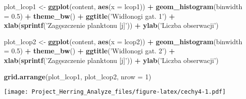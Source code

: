 \documentclass[]{article}
\newenvironment{Shaded}{\begin{snugshade}}{\end{snugshade}}
\newcommand{\DataTypeTok}[1]{\textcolor[rgb]{0.13,0.29,0.53}{#1}}
\newcommand{\DecValTok}[1]{\textcolor[rgb]{0.00,0.00,0.81}{#1}}
\newcommand{\FloatTok}[1]{\textcolor[rgb]{0.00,0.00,0.81}{#1}}
\newcommand{\KeywordTok}[1]{\textcolor[rgb]{0.13,0.29,0.53}{\textbf{#1}}}
\newcommand{\NormalTok}[1]{#1}
\newcommand{\OperatorTok}[1]{\textcolor[rgb]{0.81,0.36,0.00}{\textbf{#1}}}
\newcommand{\StringTok}[1]{\textcolor[rgb]{0.31,0.60,0.02}{#1}}
\begin{document}
\begin{Shaded}
\begin{Highlighting}[]
\NormalTok{plot_lcop1 <-}\StringTok{ }\KeywordTok{ggplot}\NormalTok{(content, }\KeywordTok{aes}\NormalTok{(}\DataTypeTok{x =}\NormalTok{ lcop1)) }\OperatorTok{+}\StringTok{ }\KeywordTok{geom_histogram}\NormalTok{(}\DataTypeTok{binwidth =} \FloatTok{0.5}\NormalTok{) }\OperatorTok{+}
\StringTok{  }\KeywordTok{theme_bw}\NormalTok{() }\OperatorTok{+}\StringTok{ }\KeywordTok{ggtitle}\NormalTok{(}\StringTok{'Widłonogi gat. 1'}\NormalTok{) }\OperatorTok{+}\StringTok{ }
\StringTok{  }\KeywordTok{xlab}\NormalTok{(}\KeywordTok{sprintf}\NormalTok{(}\StringTok{'Zagęszczenie planktonu [j]'}\NormalTok{)) }\OperatorTok{+}\StringTok{ }\KeywordTok{ylab}\NormalTok{(}\StringTok{'Liczba obserwacji'}\NormalTok{)}

\NormalTok{plot_lcop2 <-}\StringTok{ }\KeywordTok{ggplot}\NormalTok{(content, }\KeywordTok{aes}\NormalTok{(}\DataTypeTok{x =}\NormalTok{ lcop2)) }\OperatorTok{+}\StringTok{ }\KeywordTok{geom_histogram}\NormalTok{(}\DataTypeTok{binwidth =} \FloatTok{0.5}\NormalTok{) }\OperatorTok{+}
\StringTok{  }\KeywordTok{theme_bw}\NormalTok{() }\OperatorTok{+}\StringTok{ }\KeywordTok{ggtitle}\NormalTok{(}\StringTok{'Widłonogi gat. 2'}\NormalTok{) }\OperatorTok{+}\StringTok{ }
\StringTok{  }\KeywordTok{xlab}\NormalTok{(}\KeywordTok{sprintf}\NormalTok{(}\StringTok{'Zagęszczenie planktonu [j]'}\NormalTok{)) }\OperatorTok{+}\StringTok{ }\KeywordTok{ylab}\NormalTok{(}\StringTok{'Liczba obserwacji'}\NormalTok{)}

\KeywordTok{grid.arrange}\NormalTok{(plot_lcop1, plot_lcop2, }\DataTypeTok{nrow =} \DecValTok{1}\NormalTok{)}
\end{Highlighting}
\end{Shaded}

\texttt{[image: Project\_Herring\_Analyze\_files/figure-latex/cechy4-1.pdf]}
\end{document}
